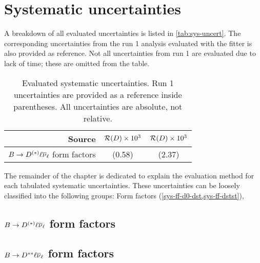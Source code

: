 \chapter{Systematic uncertainties}
\label{ref:sys-uncert}

A breakdown of all evaluated uncertainties is listed in
\cref{tab:sys-uncert}.
The corresponding uncertainties from the run 1 analysis evaluated with
the \HistFactory fitter is also provided as reference.
Not all uncertainties from run 1 are evaluated due to lack of time;
these are omitted from the table.

\begin{table}[htb]
    \caption{
        Evaluated systematic uncertainties.
        Run 1 uncertainties are provided as a reference inside parentheses.
        All uncertainties are absolute, not relative.
    }
    \centering
    \begin{tabular}{r | c | c }
        \toprule
        {\bf Source} & {\bf $\mathcal{R}(D) \times 10^3$} &
                       {\bf $\mathcal{R}(D) \times 10^3$} \\
        \midrule
        $B \rightarrow D^{(*)}\ell{\ensuremath{{\overline{\nu}}_\ell}}$ form factors &
        (0.58) & (2.37) \\
        \bottomrule
    \end{tabular}
\end{table}

The remainder of the chapter is dedicated to explain the evaluation method
for each tabulated systematic uncertainties.
These uncertainties can be loosely classified into the following groups:
Form factors (\cref{sys-ff-d0-dst,sys-ff-dstst}),


\section{$B \rightarrow D^{(*)}\ell{\ensuremath{{\overline{\nu}}_\ell}}$ form factors}
\label{sys-ff-d0-dst}


\section{$B \rightarrow D^{**}\ell{\ensuremath{{\overline{\nu}}_\ell}}$ form factors}
\label{sys-ff-dstst}


